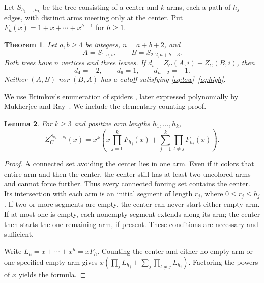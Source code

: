 \documentclass[11pt]{article}
\newtheorem{theorem}{Theorem}
\newtheorem{lemma}[theorem]{Lemma}
\newcommand{\ZC}{Z_C}
\begin{document}
Let $S_{h_1,\ldots,h_k}$ be the tree consisting of a center and $k$ arms,
each a path of $h_j$ edges, with distinct arms meeting only at the center.
Put $F_h(x)=1+x+\cdots+x^{h-1}$ for $h\geq1$.

\begin{theorem}\label{thm:main}
Let $a,b\geq4$ be integers, $n=a+b+2$, and
\[
A=S_{1,a,b},\qquad B=S_{2,2,a+b-3}.
\]
Both trees have $n$ vertices and three leaves. If
$d_i=\ZC(A,i)-\ZC(B,i)$, then
\[
d_4=-2,\qquad d_6=1,\qquad d_{n-2}=-1.
\]
Neither $(A,B)$ nor $(B,A)$ has a cutoff satisfying
\eqref{eq:low}--\eqref{eq:high}.
\end{theorem}

We use Brimkov's enumeration of spiders
\cite[Proposition 7.11, pp.~168--169]{B}, later expressed polynomially by
Mukherjee and Ray~\cite[Lemma 3.3, p.~5]{MR}.
We include the elementary counting proof.
\begin{lemma}\label{lem:enumeration}
For $k\geq3$ and positive arm lengths $h_1,\ldots,h_k$,
\[
\ZC^{S_{h_1,\ldots,h_k}}(x)
=x^k\left(x\prod_{j=1}^k F_{h_j}(x)
+\sum_{j=1}^k\prod_{t\ne j}F_{h_t}(x)\right).
\]
\end{lemma}
\begin{proof}
A connected set avoiding the center lies in one arm. Even if it colors
that entire arm and then the center, the center still has at least two
uncolored arms and cannot force further. Thus every connected forcing set
contains the center. Its intersection with each arm is an initial segment
of length $r_j$, where $0\leq r_j\leq h_j$.
If two or more segments are empty, the center can never start either
empty arm. If at most one is empty, each nonempty segment extends along
its arm; the center then starts the one remaining arm, if present.
These conditions are necessary and sufficient.

Write $L_h=x+\cdots+x^h=xF_h$. Counting the center and either no empty
arm or one specified empty arm gives
$x(\prod_j L_{h_j}+\sum_j\prod_{t\ne j}L_{h_t})$.
Factoring the powers of $x$ yields the formula.
\end{proof}
\end{document}
